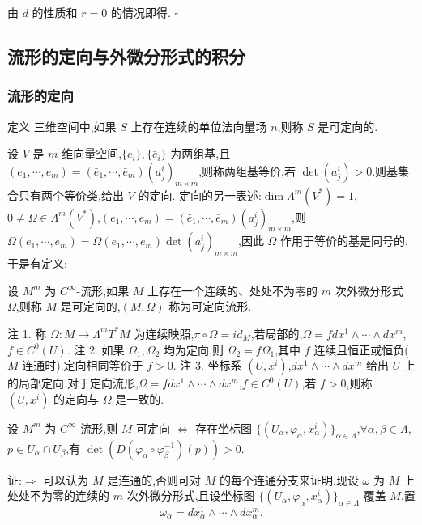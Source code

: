 由 $d$ 的性质和 $r=0$ 的情况即得. $\square$

\subsection{流形的定向与外微分形式的积分}

\subsubsection{流形的定向}

定义 三维空间中,如果 $S$ 上存在连续的单位法向量场 $n$,则称 $S$ 是可定向的.

设 $V$ 是 $m$ 维向量空间,$\{e_i\}, \{\bar{e}_i\}$ 为两组基,且 $(e_1, \cdots , e_m) = (\bar{e}_1, \cdots , \bar{e}_m)(a_j^i)_{m \times m}$,则称两组基等价,若 $\det(a_j^i) > 0$.则基集合只有两个等价类,给出 $V$ 的定向.
定向的另一表述:$\dim \Lambda^m(V^*) = 1$,$0 \neq \Omega \in \Lambda^m(V^*)$,$(e_1, \cdots , e_m) = (\bar{e}_1, \cdots , \bar{e}_m)(a_j^i)_{m \times m}$,则 $\Omega(\bar{e}_1, \cdots , \bar{e}_m) = \Omega(e_1, \cdots , e_m) \det(a_j^i)_{m \times m}$,因此 $\Omega$ 作用于等价的基是同号的.于是有定义:

\begin{definition}
设 $M^m$ 为 $C^\infty$-流形,如果 $M$ 上存在一个连续的、处处不为零的 $m$ 次外微分形式 $\Omega$,则称 $M$ 是可定向的,$(M, \Omega)$ 称为可定向流形.
\end{definition}

注 1. 称 $\Omega : M \to \Lambda^mT^*M$ 为连续映照,$\pi \circ \Omega = id_M$,若局部的,$\Omega = fdx^1 \wedge \cdots \wedge dx^m$,$f \in C^0(U)$.
注 2. 如果 $\Omega_1, \Omega_2$ 均为定向,则 $\Omega_2 = f\Omega_1$,其中 $f$ 连续且恒正或恒负($M$ 连通时).定向相同等价于 $f > 0$.
注 3. 坐标系 $(U, x^i)$,$dx^1 \wedge \cdots \wedge dx^m$ 给出 $U$ 上的局部定向.对于定向流形,$\Omega = fdx^1 \wedge \cdots \wedge dx^m$,$f \in C^0(U)$,若 $f > 0$,则称 $(U, x^i)$ 的定向与 $\Omega$ 是一致的.

\begin{theorem}
设 $M^m$ 为 $C^\infty$-流形,则 $M$ 可定向 $\iff$ 存在坐标图 $\{(U_\alpha, \varphi_\alpha, x_{\alpha}^i)\}_{\alpha \in \Lambda}$,$\forall \alpha, \beta \in \Lambda$,$p \in U_\alpha \cap U_\beta$,有 $\det(D(\varphi_\alpha \circ \varphi_\beta^{-1})(p)) > 0$.
\end{theorem}

证:$\Rightarrow$ 可以认为 $M$ 是连通的,否则可对 $M$ 的每个连通分支来证明.现设 $\omega$ 为 $M$ 上处处不为零的连续的 $m$ 次外微分形式,且设坐标图 $\{(U_\alpha, \varphi_\alpha, x_{\alpha}^i)\}_{\alpha \in \Lambda}$ 覆盖 $M$.置
\[
\omega_\alpha = dx_\alpha^1 \wedge \cdots \wedge dx_\alpha^m.
\]


